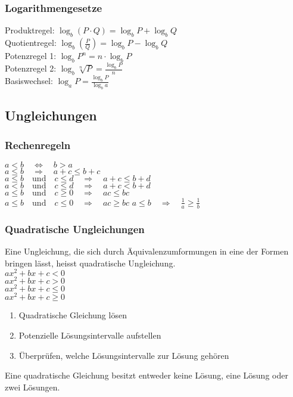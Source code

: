 \begin{multicols*}{3}
\subsubsection*{Logarithmengesetze}
Produktregel: $\log_b(P \cdot Q) = \log_b P + \log_b Q$ \\
Quotientregel: $\log_b\left(\frac{P}{Q}\right) = \log_b P - \log_b Q$ \\
Potenzregel 1: $\log_b P^n = n \cdot \log_b P$ \\
Potenzregel 2: $\log_b \sqrt[n]{P} = \frac{\log_b P}{n}$ \\
Basiswechsel: $\log_a P = \frac{\log_b P}{\log_b a}$    
\subsection*{Ungleichungen}
\subsubsection*{Rechenregeln}
    $ a < b \quad \Longleftrightarrow \quad b > a$\\
    $a \leq b \quad \Rightarrow \quad a+c \leq b+c$\\
    $a \leq b \quad\text{und}\quad c \leq d \quad \Rightarrow \quad a+c \leq b+d$\\
    $a < b \quad\text{und}\quad c \leq d \quad \Rightarrow \quad a+c < b+d$\\
    $a \leq b \quad\text{und}\quad c \geq 0 \quad \Rightarrow \quad ac \leq bc$\\
    $a \leq b \quad\text{und}\quad c \leq 0 \quad \Rightarrow \quad ac \geq bc$
    $a \leq b \quad \Rightarrow \quad \frac{1}{a} \geq \frac{1}{b}$
    \subsubsection*{Quadratische Ungleichungen}
    Eine Ungleichung, die sich durch Äquivalenzumformungen in eine der Formen bringen lässt, heisst quadratische Ungleichung.\\
    $ax^2 + bx + c < 0$\\
    $ax^2 + bx + c > 0$\\
    $ax^2 + bx + c \leq 0$\\
    $ax^2 + bx + c \geq 0$\\
    \begin{enumerate}
        \item Quadratische Gleichung lösen
        \item Potenzielle Lösungsintervalle aufstellen
        \item Überprüfen, welche Lösungsintervalle zur Lösung gehören
    \end{enumerate}
    Eine quadratische Gleichung besitzt entweder keine Lösung, eine Lösung oder zwei Lösungen.

\end{multicols*}

